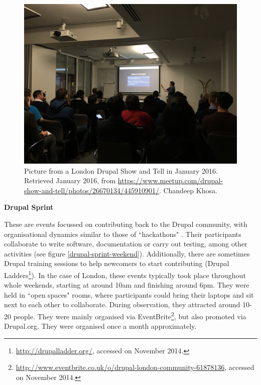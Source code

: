 \begin{figure}[H]
	\centering
	\includegraphics[scale=0.09]{img/offline/drupal_show_tell_london.jpg}
	\caption[London Drupal Show and Tell]%
    {Picture from a London Drupal Show and Tell in January 2016. Retrieved  January 2016, from \url{https://www.meetup.com/drupal-show-and-tell/photos/26670134/445910901/}. Chandeep Khosa.}
	\label{drupal-show-tell}
\end{figure}

\textbf{Drupal Sprint}

These are events focussed on contributing back to the Drupal community, with organisational dynamics similar to those of ``hackathons" \parencite{lapp20072006}. Their participants collaborate to write software, documentation or carry out testing, among other activities (see figure \ref{drupal-sprint-weekend}). Additionally, there are sometimes Drupal training sessions to help newcomers to start contributing (Drupal Ladders\footnote{\url{http://drupalladder.org/}, accessed on  November 2014.}). In the case of London, these events typically took place throughout whole weekends, starting at around 10am and finishing around 6pm. They were held in ``open spaces" rooms, where participants could bring their laptops and sit next to each other to collaborate. During observation, they attracted around 10-20 people. They were mainly organised via EventBrite\footnote{\url{http://www.eventbrite.co.uk/o/drupal-london-community-61878136}, accessed on  November 2014.}, but also promoted via Drupal.org. They were organised once a month approximately.

